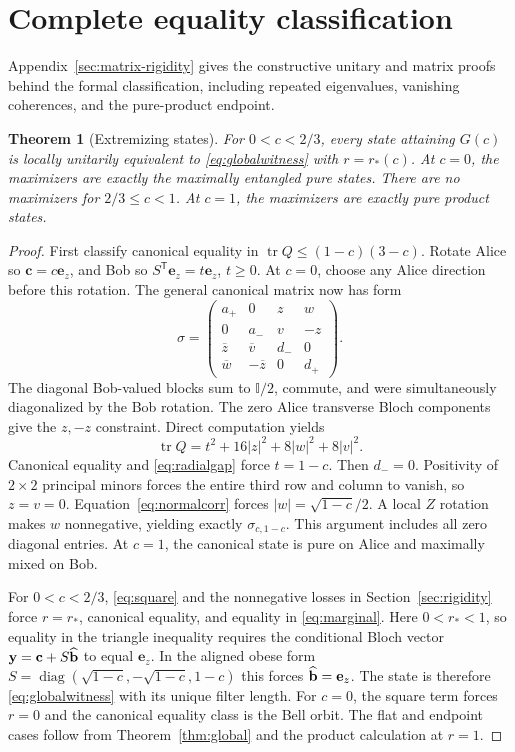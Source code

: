 \documentclass[11pt,a4paper]{article}
\newtheorem{theorem}{Theorem}
\theoremstyle{remark}\newtheorem{remark}[theorem]{Remark}
\newcommand{\tr}{\operatorname{tr}}
\newcommand{\Id}{\mathbb I}
\newcommand{\cc}{\mathbf c}\newcommand{\nn}{\mathbf n}
\newcommand{\yy}{\mathbf y}
\begin{document}
\section{Complete equality classification}\label{sec:classification}
Appendix~\ref{sec:matrix-rigidity} gives the constructive unitary and matrix
proofs behind the formal classification, including repeated eigenvalues,
vanishing coherences, and the pure-product endpoint.
\begin{theorem}[Extremizing states]\label{thm:classification}
For $0<c<2/3$, every state attaining $G(c)$ is locally unitarily equivalent
to \eqref{eq:globalwitness} with $r=r_*(c)$. At $c=0$, the maximizers are
exactly the maximally entangled pure states. There are no maximizers for
$2/3\leq c<1$. At $c=1$, the maximizers are exactly pure product states.
\end{theorem}
\begin{proof}
First classify canonical equality in $\tr Q\leq(1-c)(3-c)$.
Rotate Alice so $\cc=c\mathbf e_z$, and Bob so
$S^{\mathsf T}\mathbf e_z=t\mathbf e_z$, $t\geq0$. At $c=0$, choose any
Alice direction before this rotation. The general canonical matrix now has form
\begin{equation}\label{eq:normal}
\sigma=\begin{pmatrix}
a_+&0&z&w\\0&a_-&v&-z\\
\overline z&\overline v&d_-&0\\\overline w&-\overline z&0&d_+
\end{pmatrix}.
\end{equation}
The diagonal Bob-valued blocks sum to $\Id/2$, commute, and were simultaneously
diagonalized by the Bob rotation. The zero Alice transverse Bloch components
give the $z,-z$ constraint. Direct computation yields
\begin{equation}\label{eq:normalcorr}
\tr Q=t^2+16|z|^2+8|w|^2+8|v|^2.
\end{equation}
Canonical equality and \eqref{eq:radialgap} force $t=1-c$. Then $d_-=0$.
Positivity of $2\times2$ principal minors forces the entire third row and
column to vanish, so $z=v=0$. Equation~\eqref{eq:normalcorr} forces
$|w|=\sqrt{1-c}/2$. A local $Z$ rotation makes $w$ nonnegative, yielding exactly
$\sigma_{c,1-c}$. This argument includes all zero diagonal entries.
At $c=1$, the canonical state is pure on Alice and maximally mixed on Bob.

For $0<c<2/3$, \eqref{eq:square} and the nonnegative losses in
Section~\ref{sec:rigidity} force $r=r_*$, canonical equality, and equality in
\eqref{eq:marginal}. Here $0<r_*<1$, so equality in the triangle inequality
requires the conditional Bloch vector
$\yy=\cc+S\widehat{\bb}$ to equal $\mathbf e_z$.
In the aligned obese form
$S=\operatorname{diag}(\sqrt{1-c},-\sqrt{1-c},1-c)$ this forces
$\widehat{\mathbf b}=\mathbf e_z$. The state is therefore
\eqref{eq:globalwitness} with its unique filter length.
For $c=0$, the square term forces $r=0$ and the canonical equality class is
the Bell orbit. The flat and endpoint cases follow from Theorem~\ref{thm:global}
and the product calculation at $r=1$.
\end{proof}
\end{document}
